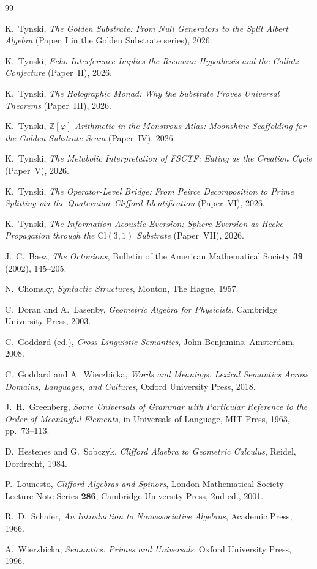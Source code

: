 \documentclass[11pt,a4paper]{article}
\theoremstyle{plain}
\theoremstyle{definition}
\theoremstyle{remark}
\numberwithin{equation}{section}
\providecommand{\Cl}{\mathrm{Cl}}
\providecommand{\ZZ}{\mathbb{Z}}
\begin{document}
\begin{thebibliography}{99}


K.~Tynski,
\emph{The Golden Substrate: From Null Generators to the Split Albert
Algebra} (Paper~I in the Golden Substrate series), 2026.

K.~Tynski,
\emph{Echo Interference Implies the Riemann Hypothesis and the Collatz
Conjecture} (Paper~II), 2026.

K.~Tynski,
\emph{The Holographic Monad: Why the Substrate Proves Universal Theorems}
(Paper~III), 2026.

K.~Tynski,
\emph{$\ZZ[\varphi]$ Arithmetic in the Monstrous Atlas: Moonshine
Scaffolding for the Golden Substrate Seam} (Paper~IV), 2026.

K.~Tynski,
\emph{The Metabolic Interpretation of FSCTF: Eating as the Creation Cycle}
(Paper~V), 2026.

K.~Tynski,
\emph{The Operator-Level Bridge: From Peirce Decomposition to Prime
Splitting via the Quaternion--Clifford Identification} (Paper~VI), 2026.

K.~Tynski,
\emph{The Information-Acoustic Eversion: Sphere Eversion as Hecke
Propagation through the $\Cl(3,1)$ Substrate} (Paper~VII), 2026.


J.~C.\ Baez,
\emph{The Octonions},
Bulletin of the American Mathematical Society \textbf{39} (2002),
145--205.

N.~Chomsky,
\emph{Syntactic Structures},
Mouton, The Hague, 1957.

C.~Doran and A.\ Lasenby,
\emph{Geometric Algebra for Physicists},
Cambridge University Press, 2003.

C.~Goddard (ed.),
\emph{Cross-Linguistic Semantics},
John Benjamins, Amsterdam, 2008.

C.~Goddard and A.\ Wierzbicka,
\emph{Words and Meanings: Lexical Semantics Across Domains,
Languages, and Cultures},
Oxford University Press, 2018.

J.~H.\ Greenberg,
\emph{Some Universals of Grammar with Particular Reference to the
Order of Meaningful Elements},
in Universals of Language, MIT Press, 1963, pp.\ 73--113.

D.~Hestenes and G.\ Sobczyk,
\emph{Clifford Algebra to Geometric Calculus},
Reidel, Dordrecht, 1984.

P.~Lounesto,
\emph{Clifford Algebras and Spinors},
London Mathematical Society Lecture Note Series \textbf{286},
Cambridge University Press, 2nd ed., 2001.

R.~D.\ Schafer,
\emph{An Introduction to Nonassociative Algebras},
Academic Press, 1966.

A.~Wierzbicka,
\emph{Semantics: Primes and Universals},
Oxford University Press, 1996.

\end{thebibliography}
\end{document}
